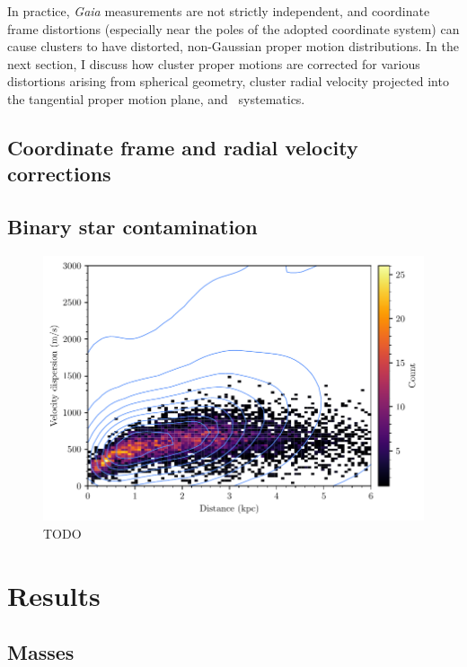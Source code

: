 In practice, \emph{Gaia} measurements are not strictly independent, and coordinate frame distortions (especially near the poles of the adopted coordinate system) can cause clusters to have distorted, non-Gaussian proper motion distributions. In the next section, I discuss how cluster proper motions are corrected for various distortions arising from spherical geometry, cluster radial velocity projected into the tangential proper motion plane, and \gaia\ systematics.


\subsection{Coordinate frame and radial velocity corrections}
\label{sec:dynamics:velocities:correction}


\subsection{Binary star contamination}
\label{sec:dynamics:velocities:binaries}

\begin{figure}[t]
    \centering
    \includegraphics[width=\textwidth]{fig/c4/dispersion_binaries.pdf}
    \caption[TODO]{TODO}
    \label{fig:dynamics:velocities:binary_contamination}
\end{figure}


\section{Results}
\label{sec:dynamics:results}


\subsection{Masses}
\label{sec:dynamics:results:masses}


